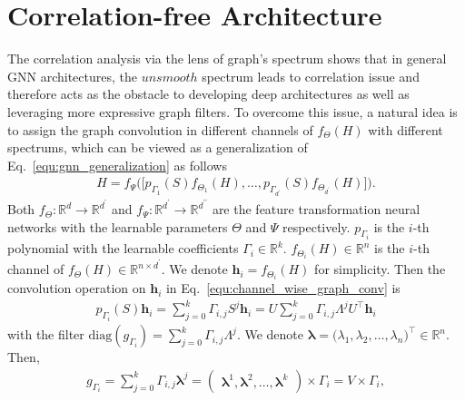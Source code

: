 \documentclass[nohyperref]{article}
\theoremstyle{plain}
\theoremstyle{definition}
\theoremstyle{remark}
\begin{document}
\section{Correlation-free Architecture}
\label{sec:channel_wise_architecture}

The correlation analysis via the lens of graph's spectrum shows that in general GNN architectures, the $unsmooth$ spectrum leads to correlation issue and therefore acts as the obstacle to developing deep architectures as well as leveraging more expressive graph filters.
To overcome this issue, a natural idea is to assign the graph convolution in different channels of $f_{\Theta}(H)$ with different spectrums, which can be viewed as a generalization of Eq.~\ref{equ:gnn_generalization} as follows
\begin{equation}
	\label{equ:channel_wise_graph_conv}
	\begin{aligned}
		H=f_{\Psi}\big(\bigl[p_{\Gamma_1}(S)f_{\Theta_1}(H), \dots , p_{\Gamma_{d^{\prime}}}(S)f_{\Theta_{d^{\prime}}}(H)\bigr]\bigr).
	\end{aligned}
\end{equation}
Both $f_{\Theta}:\mathbb R^d\rightarrow\mathbb R^{d^{\prime}}$ and $f_{\Psi}:\mathbb R^{d^{\prime}}\rightarrow\mathbb R^{d^{\prime\prime}}$ are the feature transformation neural networks with the learnable parameters $\Theta$ and $\Psi$ respectively.
$p_{\Gamma_i}$ is the $i$-th polynomial with the learnable coefficients $\Gamma_i\in\mathbb R^k$.
$f_{\Theta_i}(H)\in\mathbb R^n$ is the $i$-th channel of $f_{\Theta}(H)\in\mathbb R^{n\times d^{\prime}}$.
We denote $\bm h_i=f_{\Theta_i}(H)$ for simplicity.
Then the convolution operation on $\bm h_i$ in Eq.~\ref{equ:channel_wise_graph_conv} is
\begin{equation}
	\label{equ:channel_wise_filter}
	\begin{aligned}
		p_{\Gamma_i}(S)\bm h_i = \sum_{j=0}^{k}\Gamma_{i, j} S^j \bm h_i = U\sum_{j=0}^{k}\Gamma_{i, j}\Lambda^j U^{\top}\bm h_i
	\end{aligned}
\end{equation}
with the filter $\mathrm{diag}(g_{\Gamma_i}) = \sum_{j=0}^{k}\Gamma_{i, j}\Lambda^j$.
We denote $\bm\lambda=\bigl(\lambda_1, \lambda_2, \dots, \lambda_n\bigr)^{\top}\in\mathbb R^n$.
Then,
\begin{equation}
	\label{equ:vandermonde}
	\begin{aligned}
		g_{\Gamma_i}=\sum_{j=0}^k\Gamma_{i, j}\bm\lambda^j=
		\begin{pmatrix}
			\bm\lambda^1,\bm\lambda^2,\dots,\bm\lambda^k
		\end{pmatrix}
		\times\Gamma_i=V\times\Gamma_i,
	\end{aligned}
\end{equation}
\end{document}
